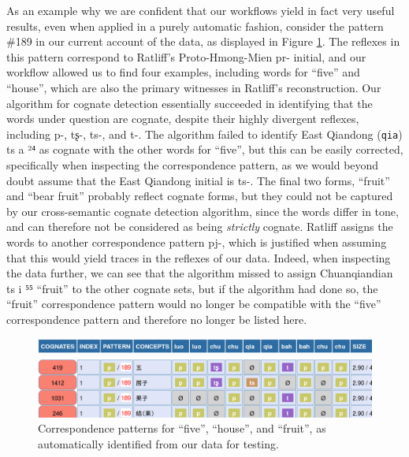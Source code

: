 \documentclass[xetex,svgnames]{scrartcl}
\begin{document}
As an example why we are confident that our workflows yield in fact very useful results, even when
applied in a purely automatic fashion, consider the pattern \#189 in our current account of the
data, as displayed in Figure \ref{fig:fruit}. The reflexes in this pattern correspond to Ratliff's Proto-Hmong-Mien {\sil *pr-} initial, and
our workflow allowed us to find four examples, including words for ``five'' and ``house'', which are
also the primary witnesses in Ratliff's reconstruction. Our algorithm for cognate detection
essentially succeeded in identifying that the words under question are cognate, despite their highly
divergent reflexes, including {\sil p-}, {\sil tʂ-}, {\sil ts-}, and {\sil t-}. The algorithm failed
to identify East Qiandong (\texttt{qia}) {\sil ts a ²⁴} as cognate with the other words for
``five'', but this can be easily corrected, specifically when inspecting the correspondence pattern,
as we would beyond doubt assume that the East Qiandong initial is {\sil ts-}. The final two forms, 
``fruit'' and ``bear fruit'' probably reflect cognate forms, but they could not be captured by our
cross-semantic cognate detection algorithm, since the words differ in tone, and can therefore not be
considered as being \emph{strictly} cognate. Ratliff assigns the words to another correspondence
pattern {\sil *pj-}, which is justified when assuming that this would yield traces in the reflexes
of our data. Indeed, when inspecting the data further, we can see that the algorithm missed
to assign Chuanqiandian {\sil ts i ⁵⁵} ``fruit'' to the other cognate sets, but if the algorithm had
done so, the ``fruit'' correspondence pattern would no longer be compatible with the ``five''
correspondence pattern and therefore no longer be listed here. 

\begin{figure}[htb]
  \centering
  \includegraphics[width=\textwidth]{five.png}
  \caption{Correspondence patterns for ``five'', ``house'', and ``fruit'', as automatically
  identified from our data for testing.}
  \label{fig:fruit}
\end{figure}
\end{document}
